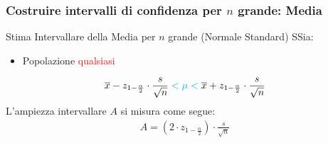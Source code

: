 \documentclass{article}  %
\theoremstyle{definition}
\begin{document}
\subsubsection{Costruire intervalli di confidenza per $n$ grande: Media}
\begin{theorem}{Stima Intervallare della Media per $n$ grande (Normale Standard)}
	SSia:
	\begin{itemize}
		\item Popolazione \textcolor{red}{qualsiasi}
	\end{itemize}
	\begin{align*}
		\overline{x}-z_{1-\frac{\alpha}{2}}\cdot \frac{s}{\sqrt{n}} \textcolor{cyan}{\; < \mu < \;} \overline{x}+z_{1-\frac{\alpha}{2}}\cdot \frac{s}{\sqrt{n}}
	\end{align*}
	L'ampiezza intervallare $A$ si misura come segue:
	\begin{align*}
		A = \left(2\cdot z_{1-\frac{\alpha}{2}}\right) \cdot \frac{s}{\sqrt{n}}
	\end{align*}
\end{theorem}
\end{document}
